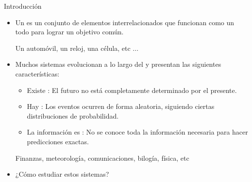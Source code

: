 \documentclass[10pt, envcountsect, handout, aspectratio=1610, hyperref={hypertexnames=true}]{beamer}
\begin{document}
\begin{frame}{Introducción}
\begin{itemize}
\item Un  es un conjunto de elementos interrelacionados que funcionan como un todo para lograr un objetivo común.

    \unEjemplo Un automóvil, un reloj, una célula, etc ...
\hfil
{}


\item Muchos sistemas evolucionan a lo largo del  y  presentan las siguientes características:

\begin{itemize}
\item Existe : El futuro no está completamente determinado por el presente.

\item Hay : Los eventos ocurren de forma aleatoria, siguiendo ciertas distribuciones de probabilidad.

\item La información es : No se conoce toda la información necesaria para hacer predicciones exactas.

\end{itemize}

\unEjemplo Finanzas, meteorología, comunicaciones, bilogía, física, etc\\

\item ¿Cómo estudiar estos sistemas?


\end{itemize}
\end{frame}
\end{document}
